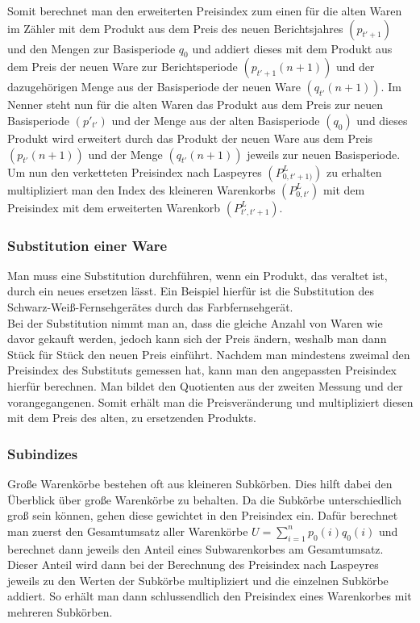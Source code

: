 \documentclass[a4paper]{article}
\begin{document}
Somit berechnet man den erweiterten Preisindex zum einen für die alten Waren im Zähler mit dem Produkt aus dem Preis des neuen Berichtsjahres $(p_{t'+1})$ und den Mengen zur Basisperiode $q_0$  und addiert dieses mit dem Produkt aus dem Preis der neuen Ware zur Berichtsperiode $(p_{t'+1}(n+1))$ und der dazugehörigen Menge aus der Basisperiode der neuen Ware $(q_{t'}(n+1))$.
Im Nenner steht nun für die alten Waren das Produkt aus dem Preis zur neuen Basisperiode $(p'_{t'})$ und der Menge aus der alten Basisperiode $(q_0)$ und dieses Produkt wird erweitert durch das Produkt der neuen Ware aus dem Preis  $(p_{t'}(n+1))$ und der Menge $(q_{t'}(n+1))$ jeweils zur neuen Basisperiode.\\
Um nun den verketteten Preisindex nach Laspeyres $(P^L_{0,t'+1)})$ zu erhalten multipliziert man den Index des kleineren Warenkorbs $(P^L_{0,t'})$ mit dem Preisindex mit dem erweiterten Warenkorb $(P^L_{t',t'+1})$.

\subsubsection{Substitution einer Ware}
Man muss eine Substitution durchführen, wenn ein Produkt, das veraltet ist, durch ein neues ersetzen lässt. Ein Beispiel hierfür ist die Substitution des Schwarz-Weiß-Fernsehgerätes durch das Farbfernsehgerät.\\
\noindent Bei der Substitution nimmt man an, dass die gleiche Anzahl von Waren wie davor gekauft werden, jedoch kann sich der Preis ändern, weshalb man dann Stück für Stück den neuen Preis einführt. Nachdem man mindestens zweimal den Preisindex des Substituts gemessen hat, kann man den angepassten Preisindex hierfür berechnen. Man bildet den Quotienten aus der zweiten Messung und der vorangegangenen. Somit erhält man die Preisveränderung und multipliziert diesen mit dem Preis des alten, zu ersetzenden Produkts.

\subsubsection{Subindizes}
Große Warenkörbe bestehen oft aus kleineren Subkörben. Dies hilft dabei den Überblick über große Warenkörbe zu behalten. Da die Subkörbe unterschiedlich groß sein können, gehen diese gewichtet in den Preisindex ein. Dafür berechnet man zuerst den Gesamtumsatz aller Warenkörbe $U=\sum_{i=1}^n p_0(i)q_0(i)$ und berechnet dann jeweils den Anteil eines Subwarenkorbes am Gesamtumsatz. Dieser Anteil wird dann bei der Berechnung des Preisindex nach Laspeyres jeweils zu den Werten der Subkörbe multipliziert und die einzelnen Subkörbe addiert. So erhält man dann schlussendlich den Preisindex eines Warenkorbes mit mehreren Subkörben.
\end{document}
